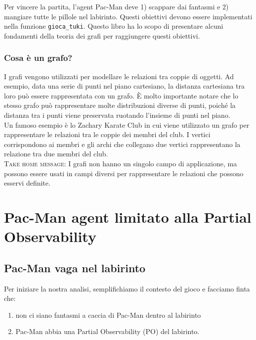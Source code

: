 \documentclass[8pt]{book}
\begin{document}
Per vincere la partita, l'agent Pac-Man deve 1) scappare dai fantasmi e 2) mangiare tutte le pillole nel labirinto. Questi obiettivi devono essere implementati nella funzione \texttt{gioca\_tuki}. Questo libro ha lo scopo di presentare alcuni fondamenti della teoria dei grafi per raggiungere questi obiettivi.


\section{Cosa è un grafo?}

I grafi vengono utilizzati per modellare le relazioni tra coppie di oggetti. Ad esempio, data una serie di punti nel piano cartesiano, la distanza cartesiana tra loro può essere rappresentata con un grafo. È molto importante notare che lo stesso grafo può rappresentare molte distribuzioni diverse di punti, poiché la distanza tra i punti viene preservata ruotando l'insieme di punti nel piano.\\
Un famoso esempio è lo Zachary Karate Club \cite{Zachary} in cui viene utilizzato un grafo per rappresentare le relazioni tra le coppie dei membri del club. I vertici corrispondono ai membri e gli archi che collegano due vertici rappresentano la relazione tra due membri del club.\\

\textsc{Take home message:} I grafi non hanno un singolo campo di applicazione, ma possono essere usati in campi diversi per rappresentare le relazioni che possono esservi definite.


\part{Pac-Man agent limitato alla Partial Observability}

\chapter{Pac-Man vaga nel labirinto}

Per iniziare la nostra analisi, semplifichiamo il contesto del gioco e facciamo finta che:

\begin{enumerate}
\item
  non ci siano fantasmi a caccia di Pac-Man dentro al labirinto
\item
  Pac-Man abbia una Partial Observability (PO) del labirinto.
\end{enumerate}
\end{document}
